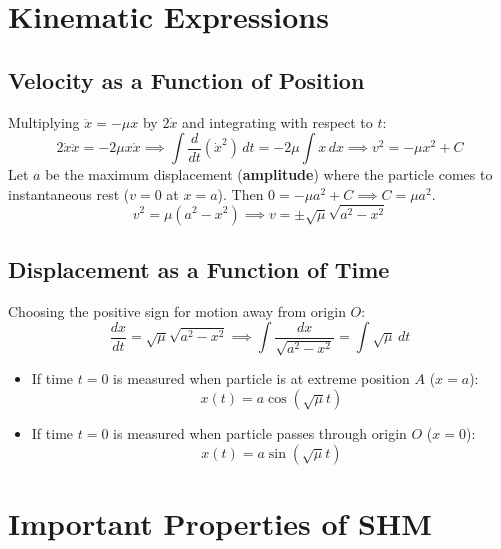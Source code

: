 \section{Kinematic Expressions}

\subsection{Velocity as a Function of Position}
Multiplying $\ddot{x} = -\mu x$ by $2 \dot{x}$ and integrating with respect to $t$:
\begin{equation}
    2 \dot{x} \ddot{x} = -2\mu x \dot{x} \implies \int \frac{d}{dt}(\dot{x}^2) \, dt = -2\mu \int x \, dx \implies v^2 = -\mu x^2 + C
\end{equation}
Let $a$ be the maximum displacement (\textbf{amplitude}) where the particle comes to instantaneous rest ($v = 0$ at $x = a$). Then $0 = -\mu a^2 + C \implies C = \mu a^2$.
\begin{equation}
    v^2 = \mu (a^2 - x^2) \implies v = \pm \sqrt{\mu} \sqrt{a^2 - x^2}
\end{equation}

\subsection{Displacement as a Function of Time}
Choosing the positive sign for motion away from origin $O$:
\begin{equation}
    \frac{dx}{dt} = \sqrt{\mu}\sqrt{a^2 - x^2} \implies \int \frac{dx}{\sqrt{a^2 - x^2}} = \int \sqrt{\mu} \, dt
\end{equation}
\begin{itemize}
    \item If time $t=0$ is measured when particle is at extreme position $A$ ($x = a$):
    \begin{equation}
        x(t) = a \cos(\sqrt{\mu} t)
    \end{equation}
    \item If time $t=0$ is measured when particle passes through origin $O$ ($x = 0$):
    \begin{equation}
        x(t) = a \sin(\sqrt{\mu} t)
    \end{equation}
\end{itemize}

\section{Important Properties of SHM}

